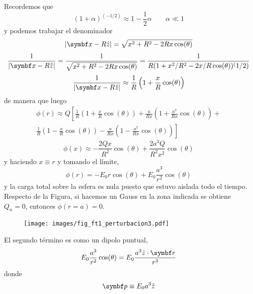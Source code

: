\documentclass[10pt,oneside]{CBFT_book}
\begin{document}
Recordemos que
\[
	(1+\alpha)^{(-1/2)} \approx 1 - \frac{1}{2}\alpha \qquad \alpha \ll 1
\]
y podemos trabajar el denominador
\[
	|\vb{x} - R\hat{z}| = \sqrt{ x^2 + R^2 - 2Rx\cos(\theta)}
\]
\[
	\frac{1}{|\vb{x} - R\hat{z}|} = \frac{1}{\sqrt{ x^2 + R^2 - 2Rx\cos(\theta)}} =
	\frac{1}{R(1 + x^2/R^2 - 2x/R\cos(\theta))^(1/2)}
\]
\[
	\frac{1}{|\vb{x} - R\hat{z}|} \approx \frac{1}{R}\left(1+ \frac{x}{R} \cos(\theta) \right)
\]
de manera que luego
\begin{multline*}
	\phi(r) \approx Q\left[ \frac{1}{R}\left(1+ \frac{x}{R} \cos(\theta) \right) + 
	\frac{a}{Rx}\left(1+ \frac{a^2}{Rx} \cos(\theta) \right) + \right. \\
	\left. \frac{1}{R}\left(1 - \frac{x}{R} \cos(\theta) \right) -
	\frac{a}{Rx}\left(1 - \frac{a^2}{Rx} \cos(\theta) \right) \right]
\end{multline*}
\[
	\phi(x) \approx -\frac{2Qx}{R^2} \cos(\theta) + \frac{2a^3Q}{R^2x^2}\cos(\theta)
\]
y haciendo $x\equiv r$ y tomando el límite,
\[
	\phi(r) = -E_0 r \cos(\theta) + E_0\frac{a^3}{r^2} \cos(\theta)
\]
y la carga total sobre la esfera es nula puesto que estuvo aislada todo el tiempo.
Respecto de la Figura, si hacemos un Gauss en la zona indicada se obtiene $Q_n=0$,
entonces $\phi(r=a)=0$.

\begin{figure}[htb]
	\begin{center}
	\texttt{[image: images/fig\_ft1\_perturbacion3.pdf]}	 
	\end{center}
	\caption{}
\end{figure}

El segundo término es como un dipolo puntual,
\[
	E_0\frac{a^3}{r^2} \cos(\theta) = E_0\frac{a^3 \hat{z}\cdot\vb{r}}{r^3} 
\]
donde
\[
	\vb{p} \equiv E_0 a^3 \hat{z}
\]
\end{document}
